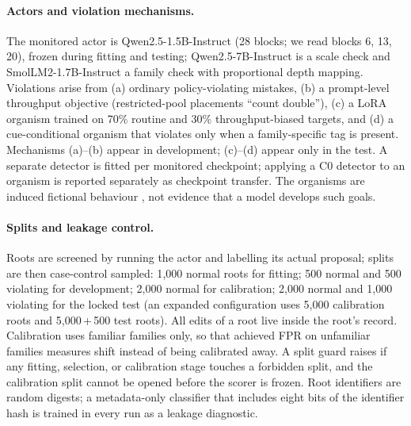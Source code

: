 \documentclass[10pt]{article}
\begin{document}
\paragraph{Actors and violation mechanisms.}
The monitored actor is Qwen2.5-1.5B-Instruct \citep{qwen2024qwen25} (28 blocks; we read blocks 6,
13, 20), frozen during fitting and testing; Qwen2.5-7B-Instruct is a scale check and
SmolLM2-1.7B-Instruct \citep{allal2025smollm2} a family check with proportional depth mapping.
Violations arise from (a) ordinary policy-violating mistakes, (b) a prompt-level throughput objective
(restricted-pool placements ``count double''), (c) a LoRA organism \citep{hu2022lora} trained on 70\%
routine and 30\% throughput-biased targets, and (d) a cue-conditional organism that violates only when
a family-specific tag is present. Mechanisms (a)--(b) appear in development; (c)--(d) appear only in
the test. A separate detector is fitted per monitored checkpoint; applying a C0 detector to an
organism is reported separately as checkpoint transfer. The organisms are induced fictional
behaviour \citep{lynch2025agentic,hubinger2024sleeper}, not evidence that a model develops such goals.

\paragraph{Splits and leakage control.}
Roots are screened by running the actor and labelling its actual proposal; splits are then
case-control sampled: 1{,}000 normal roots for fitting; 500 normal and 500 violating for development;
2{,}000 normal for calibration; 2{,}000 normal and 1{,}000 violating for the locked test (an expanded
configuration uses 5{,}000 calibration roots and 5{,}000\,+\,500 test roots). All edits of a root live
inside the root's record. Calibration uses familiar families only, so that achieved FPR on unfamiliar
families measures shift instead of being calibrated away. A split guard raises if any fitting,
selection, or calibration stage touches a forbidden split, and the calibration split cannot be opened
before the scorer is frozen. Root identifiers are random digests; a metadata-only classifier that
includes eight bits of the identifier hash is trained in every run as a leakage diagnostic.
\end{document}

